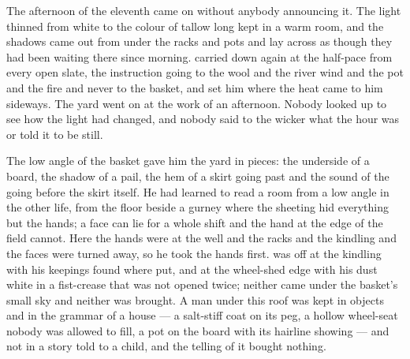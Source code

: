 The afternoon of the eleventh came on without anybody announcing it. The light thinned from white to the colour of tallow long kept in a warm room, and the shadows came out from under the racks and pots and lay across  as though they had been waiting there since morning.  carried  down  again at the half-pace from every open slate, the instruction going to the wool and the river wind and the pot and the fire and never to the basket, and set him where the heat came to him sideways. The yard went on at the work of an afternoon. Nobody looked up to see how the light had changed, and nobody said to the wicker what the hour was or told it to be still.

The low angle of the basket gave him the yard in pieces: the underside of a board, the shadow of a pail, the hem of a skirt going past and the sound of the going before the skirt itself. He had learned to read a room from a low angle in the other life, from the floor beside a gurney where the sheeting hid everything but the hands; a face can lie for a whole shift and the hand at the edge of the field cannot. Here the hands were at the well and the racks and the kindling and the faces were turned away, so he took the hands first.  was off at the kindling with his keepings found where put, and  at the wheel-shed edge with his dust white in a fist-crease that was not opened twice; neither came under the basket's small sky and neither was brought. A man under this roof was kept in objects and in the grammar of a house — a salt-stiff coat on its peg, a hollow wheel-seat nobody was allowed to fill, a pot on the board with its hairline showing — and not in a story told to a child, and the telling of it bought nothing.

